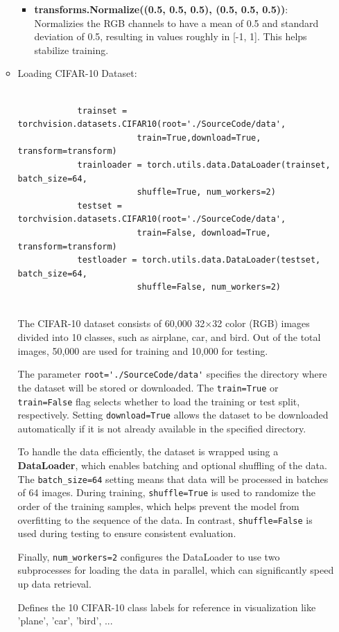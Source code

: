 \documentclass[a4paper,12pt]{article}
\begin{document}
\begin{itemize}
\begin{itemize}
\begin{itemize}
            \item \textbf{transforms.Normalize((0.5, 0.5, 0.5), (0.5, 0.5, 0.5))}: Normalizies the RGB channels to have a mean of 0.5 and standard deviation of 0.5, resulting in values roughly in [-1, 1]. This helps stabilize training.
        \end{itemize}

        \item Loading CIFAR-10 Dataset:
        \begin{Verbatim}[xleftmargin= -2cm]  
        
            trainset = torchvision.datasets.CIFAR10(root='./SourceCode/data', 
                        train=True,download=True, transform=transform)
            trainloader = torch.utils.data.DataLoader(trainset, batch_size=64,
                        shuffle=True, num_workers=2)
            testset = torchvision.datasets.CIFAR10(root='./SourceCode/data', 
                        train=False, download=True, transform=transform)
            testloader = torch.utils.data.DataLoader(testset, batch_size=64,
                        shuffle=False, num_workers=2)
                        
        \end{Verbatim}  
        The CIFAR-10 dataset consists of 60,000 32×32 color (RGB) images divided into 10 classes, such as airplane, car, and bird. Out of the total images, 50,000 are used for training and 10,000 for testing.
        
        The parameter \verb|root='./SourceCode/data'| specifies the directory where the dataset will be stored or downloaded. The \verb|train=True| or \verb|train=False| flag selects whether to load the training or test split, respectively. Setting \verb|download=True| allows the dataset to be downloaded automatically if it is not already available in the specified directory.
        
        To handle the data efficiently, the dataset is wrapped using a \textbf{DataLoader}, which enables batching and optional shuffling of the data. The \verb|batch_size=64| setting means that data will be processed in batches of 64 images. During training, \verb|shuffle=True| is used to randomize the order of the training samples, which helps prevent the model from overfitting to the sequence of the data. In contrast, \verb|shuffle=False| is used during testing to ensure consistent evaluation.
        
        Finally, \verb|num_workers=2| configures the DataLoader to use two subprocesses for loading the data in parallel, which can significantly speed up data retrieval.

        Defines the 10 CIFAR-10 class labels for reference in visualization like 'plane', 'car', 'bird', ...
    \end{itemize}
\end{itemize}
\end{document}
